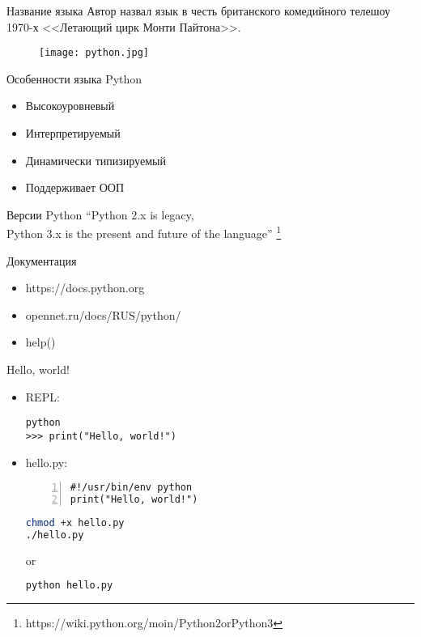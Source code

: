 \documentclass[hyperref={pdftex,unicode}]{beamer}
\begin{document}
\begin{frame}{Название языка}
  Автор назвал язык в честь британского комедийного телешоу 1970-х
  <<Летающий цирк Монти Пайтона>>.

  \begin{figure}[H]
    \texttt{[image: python.jpg]}
  \end{figure}
\end{frame}

\begin{frame}{Особенности языка Python}
  \begin{itemize}
    \item Высокоуровневый
    \item Интерпретируемый
    \item Динамически типизируемый
    \item Поддерживает ООП
  \end{itemize}
\end{frame}

\begin{frame}{Версии Python}
  \centering
  ``Python 2.x is legacy, \\
  Python 3.x is the present
  and future of the language'' \footnote[frame]{
    https://wiki.python.org/moin/Python2orPython3}
\end{frame}

\begin{frame}{Документация}
  \begin{itemize}
    \item https://docs.python.org
    \item opennet.ru/docs/RUS/python/
    \item help()
  \end{itemize}
\end{frame}

\begin{frame}[fragile]{Hello, world!}
  \begin{itemize}
  \item REPL:
    \begin{lstlisting}
python
>>> print("Hello, world!")
    \end{lstlisting}
  \item hello.py:
    \begin{lstlisting}[numbers=left]
#!/usr/bin/env python
print("Hello, world!")
    \end{lstlisting}

  \begin{minipage}{0.4\linewidth}
     \begin{lstlisting}[language=bash]
chmod +x hello.py
./hello.py
     \end{lstlisting}
   \end{minipage}
   \hfill or \hfill
   \begin{minipage}{0.4\linewidth}
     \begin{lstlisting}[language=bash]
python hello.py
     \end{lstlisting}
   \end{minipage}

  \end{itemize}
\end{frame}
\end{document}
